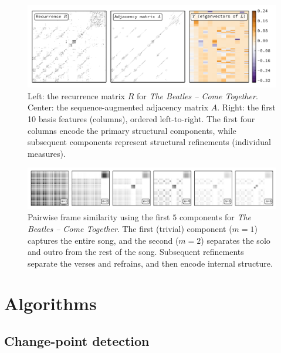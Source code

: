 \documentclass{article}
\begin{document}
\begin{figure}
\centering
\includegraphics[width=\textwidth]{figs/recurrence}
\caption{Left: the recurrence matrix $R$ for \emph{The Beatles -- Come
Together}. Center: the sequence-augmented adjacency matrix $A$.
Right: the first 10 basis features (columns), ordered left-to-right.  The first four columns encode the primary structural components, while subsequent components represent structural
refinements (individual measures).\label{recurrence}}
\end{figure}

 
\begin{figure}
\centering
\includegraphics[width=\textwidth]{figs/lowrank}
\caption{Pairwise frame similarity using the first $5$ components for \emph{The Beatles -- Come Together}.  The first
(trivial) component ($m=1$) captures the entire song, and the second ($m=2$) separates the solo and outro from the
rest of the song.  Subsequent refinements separate the verses and refrains, and then encode internal structure.\label{lowrank}}
\end{figure}

\section{Algorithms}

\subsection{Change-point detection}
\end{document}

